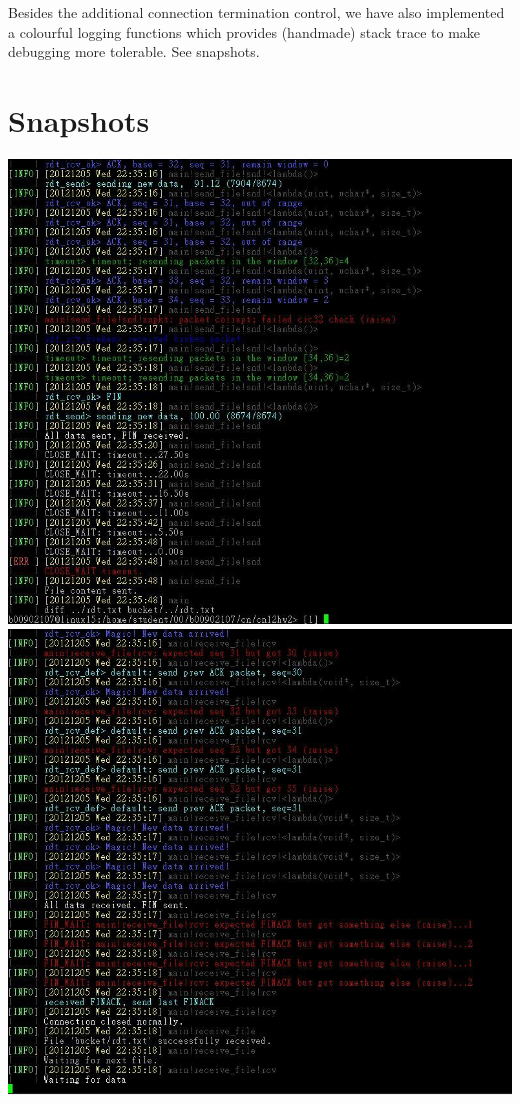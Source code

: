 \documentclass[10pt,a4paper]{article}
\begin{document}
    Besides the additional connection termination control, we have also implemented a colourful logging functions which provides (handmade) stack trace to make debugging more tolerable. See snapshots. 
\section{Snapshots}
\begin{center}
\includegraphics[scale=0.8]{shotsnd.jpg}\\
\includegraphics[scale=0.8]{shotrcv.jpg}\\

\end{center}
\end{document}

